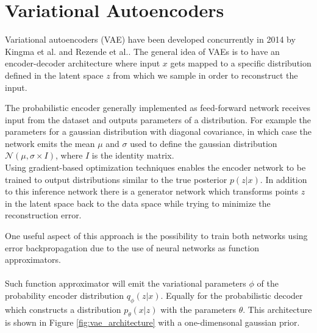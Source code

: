\section{Variational Autoencoders}
\label{sec:vae}
Variational autoencoders (VAE) have been developed concurrently in 2014 by Kingma et al.\cite{vae:2014} and Rezende et al.\cite{dlgm:2014}.
The general idea of VAEs is to have an encoder-decoder architecture where input $x$ gets mapped to a specific distribution defined in the latent space $z$ from which we sample in order to reconstruct the input.





The probabilistic encoder generally implemented as feed-forward network receives input from the dataset and outputs parameters of a distribution. For example the parameters for a gaussian distribution with diagonal covariance, in which case the network emits the mean $\mu$ and $\sigma$ used to define the gaussian distribution $\mathcal{N}(\mu,\sigma \times I)$, where $I$ is the identity matrix.\\

Using gradient-based optimization techniques enables the encoder network to be trained to output distributions similar to the true posterior $p(z|x)$.
In addition to this inference network there is a generator network which transforms points $z$ in the latent space back to the data space while trying to minimize the reconstruction error.


One useful aspect of this approach is the possibility to train both networks using error backpropagation due to the use of neural networks as function approximators.\\\\

Such function approximator will emit the variational parameters $\phi$ of the probability encoder distribution $q_\phi(z|x)$.
Equally for the probabilistic decoder which constructs a distribution $p_\theta(x|z)$ with the parameters $\theta$.
This architecture is shown in Figure \ref{fig:vae_architecture} with a one-dimensonal gaussian prior.
\\


